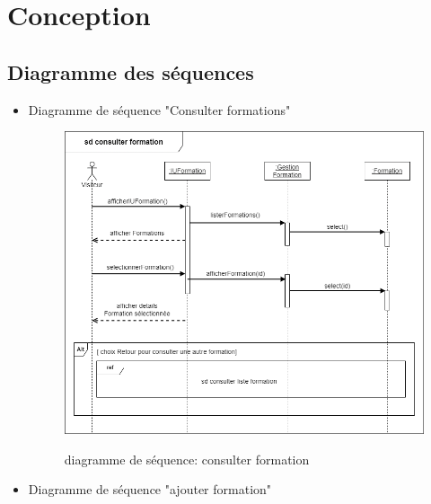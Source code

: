 \section{Conception}
\subsection{Diagramme des séquences}
\newpage
\begin{itemize}
	
	\item Diagramme de séquence "Consulter formations"
	\begin{figure}[!h]
		\centering
		{\includegraphics[width=1\textwidth]{D) IMAGES/seqconfor.png}}
		\caption{diagramme de séquence: consulter formation}
		\label{Diagramme3}
	\end{figure}

\newpage




\item Diagramme de séquence "ajouter formation"


\end{itemize}
